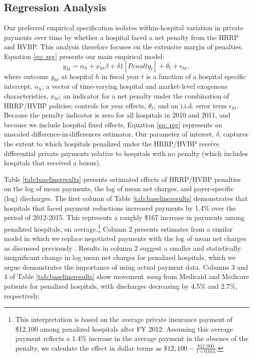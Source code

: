 \documentclass[12pt]{article}
\begin{document}
\subsection{Regression Analysis}
\label{sec:initial}
Our preferred empirical specification isolates within-hospital variation in private payments over time by whether a hospital faced a net penalty from the HRRP and HVBP. This analysis therefore focuses on the extensive margin of penalties.  Equation \ref{eq: reg} presents our main empirical model:
\begin{equation}
\label{eq: reg}
y_{ht} = \alpha_{h} + x^{'}_{ht}\beta + \delta1[Penalty_{t}]  + \theta_{t}  +  \epsilon_{ht},
\end{equation}
where outcome $y_{ht}$ at hospital $h$ in fiscal year $t$ is a function of a hospital specific intercept, $\alpha_{h}$; a vector of time-varying hospital and market-level exogenous characteristics, $x_{ht}$; an indicator for a net penalty under the combination of HRRP/HVBP policies; controls for year effects, $\theta_t$; and an i.i.d. error term $\epsilon_{ht}$.  Because the penalty indicator is zero for all hospitals in 2010 and 2011, and because we include hospital fixed effects, Equation \ref{eq: reg} represents an unscaled difference-in-differences estimator. Our parameter of interest, $\delta$, captures the extent to which hospitals penalized under the HRRP/HVBP receive differential private payments relative to hospitals with no penalty (which includes hospitals that received a bonus).

Table \ref{tab:baselineresults} presents estimated effects of HRRP/HVBP penalties on the log of mean payments, the log of mean net charges, and payer-specific (log) discharges. The first column of Table \ref{tab:baselineresults} demonstrates that hospitals that faced payment reductions increased payments by 1.4\% over the period of 2012-2015.  This represents a roughly \$167 increase in payments among penalized hospitals, on average.\footnote{This interpretation is based on the average private insurance payment of \$12,100 among penalized hospitals after FY 2012. Assuming this average payment reflects a 1.4\% increase in the average payment in the absence of the penalty, we calculate the effect in dollar terms as $\$12,100 - \frac{\$12,000}{1+0.014}$.} Column 2 presents estimates from a similar model in which we replace negotiated payments with the log of mean net charges as discussed previously \citep{dafny2009,lewis2015,schmitt2018,dranove2017}. Results in column 2 suggest a smaller and statistically insignificant change in log mean net charges for penalized hospitals, which we argue demonstrates the importance of using actual payment data.  Columns 3 and 4 of Table \ref{tab:baselineresults} show movement \textit{away} from Medicaid and Medicare patients for penalized hospitals, with discharges decreasing by 4.5\% and 2.7\%, respectively.
\end{document}

